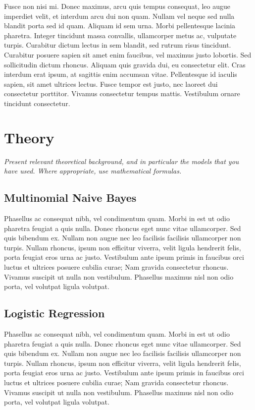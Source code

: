 \documentclass[
]{article}
\begin{document}
Fusce non nisi mi. Donec maximus, arcu quis tempus consequat, leo augue
imperdiet velit, et interdum arcu dui non quam. Nullam vel neque sed
nulla blandit porta sed id quam. Aliquam id sem urna. Morbi pellentesque
lacinia pharetra. Integer tincidunt massa convallis, ullamcorper metus
ac, vulputate turpis. Curabitur dictum lectus in sem blandit, sed rutrum
risus tincidunt. Curabitur posuere sapien sit amet enim faucibus, vel
maximus justo lobortis. Sed sollicitudin dictum rhoncus. Aliquam quis
gravida dui, eu consectetur elit. Cras interdum erat ipsum, at sagittis
enim accumsan vitae. Pellentesque id iaculis sapien, sit amet ultrices
lectus. Fusce tempor est justo, nec laoreet dui consectetur porttitor.
Vivamus consectetur tempus mattis. Vestibulum ornare tincidunt
consectetur.

\hypertarget{theory}{%
\section{Theory}\label{theory}}

\emph{Present relevant theoretical background, and in particular the
models that you have used. Where appropriate, use mathematical
formulas.}

\hypertarget{multinomial-naive-bayes}{%
\subsection{Multinomial Naive Bayes}\label{multinomial-naive-bayes}}

Phasellus ac consequat nibh, vel condimentum quam. Morbi in est ut odio
pharetra feugiat a quis nulla. Donec rhoncus eget nunc vitae
ullamcorper. Sed quis bibendum ex. Nullam non augue nec leo facilisis
facilisis ullamcorper non turpis. Nullam rhoncus, ipsum non efficitur
viverra, velit ligula hendrerit felis, porta feugiat eros urna ac justo.
Vestibulum ante ipsum primis in faucibus orci luctus et ultrices posuere
cubilia curae; Nam gravida consectetur rhoncus. Vivamus suscipit ut
nulla non vestibulum. Phasellus maximus nisl non odio porta, vel
volutpat ligula volutpat.

\hypertarget{logistic-regression}{%
\subsection{Logistic Regression}\label{logistic-regression}}

Phasellus ac consequat nibh, vel condimentum quam. Morbi in est ut odio
pharetra feugiat a quis nulla. Donec rhoncus eget nunc vitae
ullamcorper. Sed quis bibendum ex. Nullam non augue nec leo facilisis
facilisis ullamcorper non turpis. Nullam rhoncus, ipsum non efficitur
viverra, velit ligula hendrerit felis, porta feugiat eros urna ac justo.
Vestibulum ante ipsum primis in faucibus orci luctus et ultrices posuere
cubilia curae; Nam gravida consectetur rhoncus. Vivamus suscipit ut
nulla non vestibulum. Phasellus maximus nisl non odio porta, vel
volutpat ligula volutpat.
\end{document}
